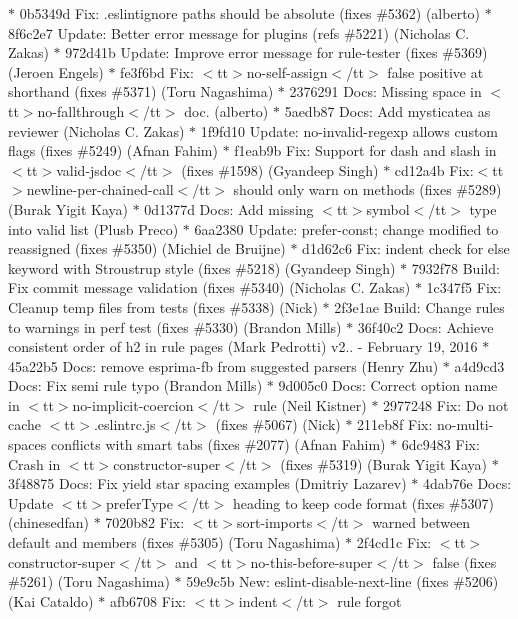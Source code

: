 \begin{DoxyItemize}
\texorpdfstring{$\ast$}{*} 0b5349d Fix\+: .\+eslintignore paths should be absolute (fixes \#5362) (alberto) \texorpdfstring{$\ast$}{*} 8f6c2e7 Update\+: Better error message for plugins (refs \#5221) (\+Nicholas C. Zakas) \texorpdfstring{$\ast$}{*} 972d41b Update\+: Improve error message for rule-\/tester (fixes \#5369) (\+Jeroen Engels) \texorpdfstring{$\ast$}{*} fe3f6bd Fix\+: $<$tt$>$no-\/self-\/assign$<$/tt$>$ false positive at shorthand (fixes \#5371) (\+Toru Nagashima) \texorpdfstring{$\ast$}{*} 2376291 Docs\+: Missing space in $<$tt$>$no-\/fallthrough$<$/tt$>$ doc. (alberto) \texorpdfstring{$\ast$}{*} 5aedb87 Docs\+: Add mysticatea as reviewer (\+Nicholas C. Zakas) \texorpdfstring{$\ast$}{*} 1f9fd10 Update\+: no-\/invalid-\/regexp allows custom flags (fixes \#5249) (\+Afnan Fahim) \texorpdfstring{$\ast$}{*} f1eab9b Fix\+: Support for dash and slash in $<$tt$>$valid-\/jsdoc$<$/tt$>$ (fixes \#1598) (\+Gyandeep Singh) \texorpdfstring{$\ast$}{*} cd12a4b Fix\+:$<$tt$>$newline-\/per-\/chained-\/call$<$/tt$>$ should only warn on methods (fixes \#5289) (\+Burak Yigit Kaya) \texorpdfstring{$\ast$}{*} 0d1377d Docs\+: Add missing $<$tt$>$symbol$<$/tt$>$ type into valid list (\+Plusb Preco) \texorpdfstring{$\ast$}{*} 6aa2380 Update\+: prefer-\/const; change modified to reassigned (fixes \#5350) (\+Michiel de Bruijne) \texorpdfstring{$\ast$}{*} d1d62c6 Fix\+: indent check for else keyword with Stroustrup style (fixes \#5218) (\+Gyandeep Singh) \texorpdfstring{$\ast$}{*} 7932f78 Build\+: Fix commit message validation (fixes \#5340) (\+Nicholas C. Zakas) \texorpdfstring{$\ast$}{*} 1c347f5 Fix\+: Cleanup temp files from tests (fixes \#5338) (\+Nick) \texorpdfstring{$\ast$}{*} 2f3e1ae Build\+: Change rules to warnings in perf test (fixes \#5330) (\+Brandon Mills) \texorpdfstring{$\ast$}{*} 36f40c2 Docs\+: Achieve consistent order of h2 in rule pages (\+Mark Pedrotti)  v2.. -\/ February 19, 2016  \texorpdfstring{$\ast$}{*} 45a22b5 Docs\+: remove esprima-\/fb from suggested parsers (\+Henry Zhu) \texorpdfstring{$\ast$}{*} a4d9cd3 Docs\+: Fix semi rule typo (\+Brandon Mills) \texorpdfstring{$\ast$}{*} 9d005c0 Docs\+: Correct option name in $<$tt$>$no-\/implicit-\/coercion$<$/tt$>$ rule (\+Neil Kistner) \texorpdfstring{$\ast$}{*} 2977248 Fix\+: Do not cache $<$tt$>$.\+eslintrc.\+js$<$/tt$>$ (fixes \#5067) (\+Nick) \texorpdfstring{$\ast$}{*} 211eb8f Fix\+: no-\/multi-\/spaces conflicts with smart tabs (fixes \#2077) (\+Afnan Fahim) \texorpdfstring{$\ast$}{*} 6dc9483 Fix\+: Crash in $<$tt$>$constructor-\/super$<$/tt$>$ (fixes \#5319) (\+Burak Yigit Kaya) \texorpdfstring{$\ast$}{*} 3f48875 Docs\+: Fix yield star spacing examples (\+Dmitriy Lazarev) \texorpdfstring{$\ast$}{*} 4dab76e Docs\+: Update $<$tt$>$prefer\+Type$<$/tt$>$ heading to keep code format (fixes \#5307) (chinesedfan) \texorpdfstring{$\ast$}{*} 7020b82 Fix\+: $<$tt$>$sort-\/imports$<$/tt$>$ warned between default and members (fixes \#5305) (\+Toru Nagashima) \texorpdfstring{$\ast$}{*} 2f4cd1c Fix\+: $<$tt$>$constructor-\/super$<$/tt$>$ and $<$tt$>$no-\/this-\/before-\/super$<$/tt$>$ false (fixes \#5261) (\+Toru Nagashima) \texorpdfstring{$\ast$}{*} 59e9c5b New\+: eslint-\/disable-\/next-\/line (fixes \#5206) (\+Kai Cataldo) \texorpdfstring{$\ast$}{*} afb6708 Fix\+: $<$tt$>$indent$<$/tt$>$ rule forgot 
\end{DoxyItemize}
